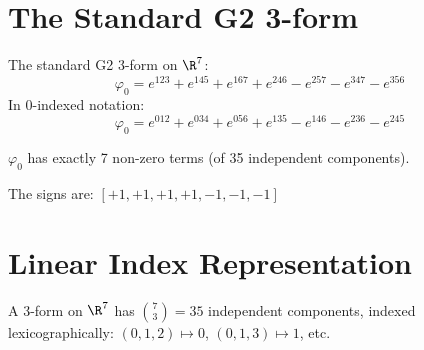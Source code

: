 \section{The Standard G2 3-form}

\begin{definition}\label{def:phi0_explicit}
    \leanok
    The standard G2 3-form on $\R^7$:
    \[
        \varphi_0 = e^{123} + e^{145} + e^{167} + e^{246} - e^{257} - e^{347} - e^{356}
    \]
    In 0-indexed notation:
    \[
        \varphi_0 = e^{012} + e^{034} + e^{056} + e^{135} - e^{146} - e^{236} - e^{245}
    \]
\end{definition}

\begin{theorem}\label{thm:phi0_seven}
    \leanok
    $\varphi_0$ has exactly 7 non-zero terms (of 35 independent components).
\end{theorem}

\begin{definition}\label{def:phi0_signs}
    \leanok
    The signs are: $[+1, +1, +1, +1, -1, -1, -1]$
\end{definition}

\section{Linear Index Representation}

\begin{definition}[C(7,3) Components]\label{def:35_components}
    \leanok
    A 3-form on $\R^7$ has $\binom{7}{3} = 35$ independent components,
    indexed lexicographically: $(0,1,2) \mapsto 0$, $(0,1,3) \mapsto 1$, etc.
\end{definition}

